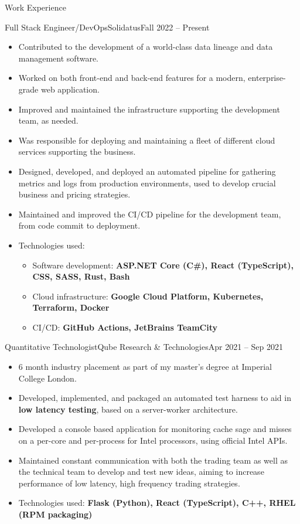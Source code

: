 \documentclass[a4paper]{mcdowellcv}
\begin{document}
\makeheader

\begin{cvsection}{Work Experience}

	\begin{cvsubsection}{Full Stack Engineer/DevOps}{Solidatus}{Fall 2022 -- Present}
		\begin{itemize}
			\item Contributed to the development of a world-class data lineage and data management software.
			\item Worked on both front-end and back-end features for a modern, enterprise-grade web application.
			\item Improved and maintained the infrastructure supporting the development team, as needed.
			\item Was responsible for deploying and maintaining a fleet of different cloud services supporting the business.
			\item Designed, developed, and deployed an automated pipeline for gathering metrics and logs from production
			      environments, used to develop crucial business and pricing strategies.
			\item Maintained and improved the CI/CD pipeline for the development team, from code commit to deployment.
			\item Technologies used:
			      \begin{itemize}
				      \item Software development: \textbf{ASP.NET Core (C\#), React (TypeScript), CSS, SASS, Rust, Bash}
				      \item Cloud infrastructure: \textbf{Google Cloud Platform, Kubernetes, Terraform, Docker}
				      \item CI/CD: \textbf{GitHub Actions, JetBrains TeamCity}
			      \end{itemize}
		\end{itemize}
	\end{cvsubsection}

	\begin{cvsubsection}{Quantitative Technologist}{Qube Research \& Technologies}{Apr 2021 -- Sep 2021}
		\begin{itemize}
			\item 6 month industry placement as part of my master's degree at Imperial College London.
			\item Developed, implemented, and packaged an automated test harness to aid in \textbf{low latency testing},
			      based on a server-worker architecture.
			\item Developed a console based application for monitoring cache sage and misses on a per-core and per-process
			      for Intel processors, using official Intel APIs.
			\item Maintained constant communication with both the trading team as well as the technical team to develop and
			      test new ideas, aiming to increase performance of low latency, high frequency trading strategies.
			\item Technologies used: \textbf{Flask (Python), React (TypeScript), C++, RHEL (RPM packaging)}
		\end{itemize}
	\end{cvsubsection}


\end{cvsection}
\end{document}
